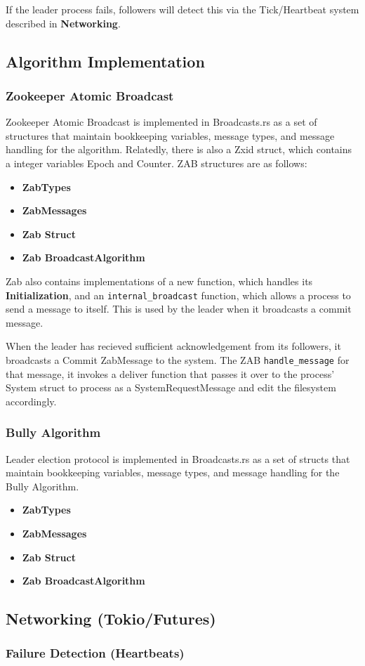 \documentclass{article}
\begin{document}
        If the leader process fails, followers will detect this via the Tick/Heartbeat system described in \textbf{Networking}.



\subsection*{Algorithm Implementation}
    \subsubsection*{Zookeeper Atomic Broadcast}
    Zookeeper Atomic Broadcast is implemented in Broadcasts.rs as a set of structures that maintain bookkeeping variables, message types, and message handling for the algorithm. Relatedly, there is also a Zxid struct, which contains a integer variables Epoch and Counter. ZAB structures are as follows:

\begin{itemize}
    \item\textbf{ZabTypes}
    \item\textbf{ZabMessages}
    \item\textbf{Zab Struct}
    \item\textbf{Zab BroadcastAlgorithm}
\end{itemize}

    Zab also contains implementations of a new function, which handles its \textbf{Initialization}, and an \verb|internal_broadcast| function, which allows a process to send a message to itself. This is used by the leader when it broadcasts a commit message.

    When the leader has recieved sufficient acknowledgement from its followers, it broadcasts a Commit ZabMessage to the system. The ZAB \verb|handle_message| for that message, it invokes a deliver function that passes it over to the process' System struct to process as a SystemRequestMessage and edit the filesystem accordingly.


    \subsubsection*{Bully Algorithm}
    Leader election protocol is implemented in Broadcasts.rs as a set of structs that maintain bookkeeping variables, message types, and message handling for the Bully Algorithm.

\begin{itemize}
    \item\textbf{ZabTypes}
    \item\textbf{ZabMessages}
    \item\textbf{Zab Struct}
    \item\textbf{Zab BroadcastAlgorithm}
\end{itemize}


\subsection*{Networking (Tokio/Futures)}
\subsubsection*{Failure Detection (Heartbeats)}
\end{document}
